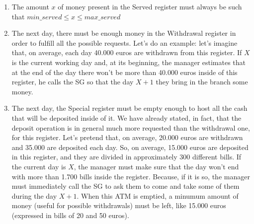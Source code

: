\documentclass{article}
\begin{document}
\begin{enumerate}
    \item The amount $x$ of money present in the Served register must always be such that $min\_served \leq x \leq max\_served$
    \item The next day, there must be enough money in the Withdrawal register in order to fulfill all the possible requests. Let's do an example: let's imagine that, on average, each day 40.000 euros are withdrawn from this register. If $X$ is the current working day and, at its beginning, the manager estimates that at the end of the day there won't be more than 40.000 euros inside of this register, he calls the SG so that the day $X+1$ they bring in the branch some money.
    \item The next day, the Special register must be empty enough to host all the cash that will be deposited inside of it. We have already stated, in fact, that the deposit operation is in general much more requested than the withdrawal one, for this register. Let's pretend that, on average, 20.000 euros are withdrawn and 35.000 are deposited each day.  So, on average, 15.000 euros are deposited in this register, and they are divided in approximately 300 different bills. If the current day is $X$, the manager must make sure that the day won't end with more than 1.700 bills inside the register. Because, if it is so, the manager must immediately call the SG to ask them to come and take some of them during the day $X+1$. When this ATM is emptied, a minumum amount of money (useful for possible withdrawals) must be left, like 15.000 euros (expressed in bills of 20 and 50 euros).
\end{enumerate}
\end{document}
